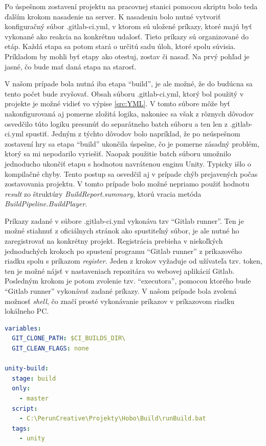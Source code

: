 \documentclass[slovak, bachelorpractice]{diploma}
\begin{document}
Po úspešnom zostavení projektu na pracovnej stanici pomocou skriptu bolo teda ďalším krokom nasadenie na server. K nasadeniu bolo nutné vytvoriť konfiguračný súbor .gitlab-ci.yml, v ktorom sú uložené príkazy, ktoré majú byť vykonané ako reakcia na konkrétnu udalosť. Tieto príkazy sú organizované do etáp. Každá etapa sa potom stará o určitú sadu úloh, ktoré spolu súvisia. Príkladom by mohli byť etapy ako otestuj, zostav či nasaď. Na prvý pohľad je jasné, čo bude mať daná etapa na starosť. 

V našom prípade bola nutná iba etapa \enquote{build}, je ale možné, že do budúcna sa tento počet bude zvyšovať. Obsah súboru .gitlab-ci.yml, ktorý bol použitý v projekte je možné vidieť vo výpise \ref{src:YML}. V tomto súbore môže byť nakonfigurovaná aj pomerne zložitá logika, nakoniec sa však z rôznych dôvodov osvedčilo túto logiku presunúť do separátneho batch súboru a ten len z .gitlab-ci.yml spustiť. Jedným z týchto dôvodov bolo napríklad, že po neúspešnom zostavení hry sa etapa \enquote{build} ukončila úspešne, čo je pomerne zásadný problém, ktorý sa mi nepodarilo vyriešiť. Naopak použitie batch súboru umožnilo jednoducho ukončiť etapu s hodnotou navrátenou enginu Unity. Typicky išlo o kompilačné chyby. Tento postup sa osvedčil aj v prípade chýb prejavených počas zostavovania projektu. V tomto prípade bolo možné nepriamo použiť hodnotu \textit{result} zo štruktúry \textit{BuildReport.summary}, ktorú vracia metóda \textit{BuildPipeline.BuildPlayer}. 

Príkazy zadané v súbore .gitlab-ci.yml vykonáva tzv \enquote{Gitlab runner}. Ten je možné stiahnuť z oficiálnych stránok ako spustiteľný súbor, je ale nutné ho zaregistrovať na konkrétny projekt. Registrácia prebieha v niekoľkých jednoduchých krokoch po spustení programu \enquote{Gitlab runner} z príkazového riadku spolu s príkazom \textit{register}. Jeden z krokov vyžaduje od užívateľa tzv. token, ten je možné nájsť v nastaveniach repozitára vo webovej aplikácií Gitlab. Posledným krokom je potom zvolenie tzv. \enquote{executora}, pomocou ktorého bude  \enquote{Gitlab runner} vykonávať zadané príkazy. V našom prípade bola zvolená možnosť \textit{shell}, čo značí prosté vykonávanie príkazov v príkazovom riadku lokálneho PC.

\vspace{10pt}
\begin{lstlisting}[language=yml,label=src:YML,caption={Obsah súboru .gitlab-ci.yml}]
variables:
  GIT_CLONE_PATH: $CI_BUILDS_DIR\
  GIT_CLEAN_FLAGS: none

unity-build: 
  stage: build
  only:
    - master
  script:
    - C:\PerunCreative\Projekty\Hobo\Build\runBuild.bat
  tags: 
    - unity
\end{lstlisting}
\end{document}
